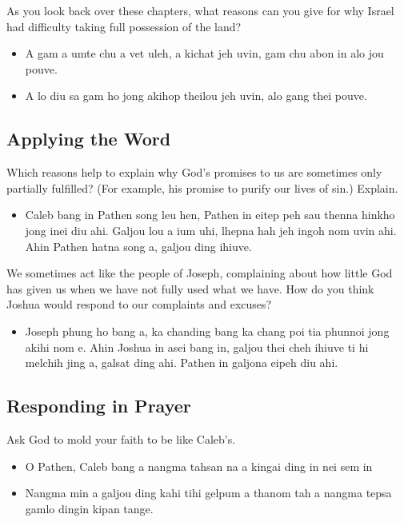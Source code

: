 \documentclass[11pt]{article}
\begin{document}
As you look back over these chapters, what reasons can you give for
why Israel had difficulty taking full possession of the land?
\begin{itemize}
\item A gam a umte chu a vet uleh, a kichat jeh uvin, gam chu abon in alo
jou pouve.
\item A lo diu sa gam ho jong akihop theilou jeh uvin, alo gang thei pouve.
\end{itemize}

\subsection{Applying the Word}
\label{sec:org0c065e6}

Which reasons help to explain why God's promises to us are sometimes
only partially fulfilled? (For example, his promise to purify our
lives of sin.) Explain.
\begin{itemize}
\item Caleb bang in Pathen song leu hen, Pathen in eitep peh sau thenna
hinkho jong inei diu ahi. Galjou lou a ium uhi, lhepna hah jeh ingoh
nom uvin ahi. Ahin Pathen hatna song a, galjou ding ihiuve.
\end{itemize}

We sometimes act like the people of Joseph, complaining about how
little God has given us when we have not fully used what we have. How
do you think Joshua would respond to our complaints and excuses?
\begin{itemize}
\item Joseph phung ho bang a, ka chanding bang ka chang poi tia phunnoi
jong akihi nom e. Ahin Joshua in asei bang in, galjou thei cheh
ihiuve ti hi melchih jing a, galsat ding ahi. Pathen in galjona
eipeh diu ahi.
\end{itemize}

\subsection{Responding in Prayer}
\label{sec:org46e6e30}

Ask God to mold your faith to be like Caleb's.
\begin{itemize}
\item O Pathen, Caleb bang a nangma tahsan na a kingai ding in nei sem in
\item Nangma min a galjou ding kahi tihi gelpum a thanom tah a nangma
tepsa gamlo dingin kipan tange.
\end{itemize}
\end{document}

